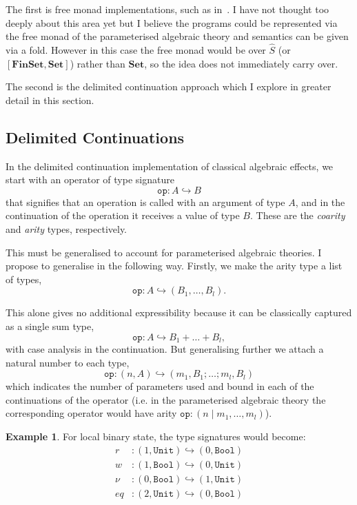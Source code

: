 \documentclass{scrartcl}
\theoremstyle{definition}
\newtheorem{example}[theorem]{Example}
\newcommand{\Set}{\mathbf{Set}}
\newcommand{\Fin}{\mathbf{FinSet}}
\newcommand{\op}{\mathtt{op}}
\newcommand{\Unit}{\mathtt{Unit}}
\newcommand{\Bool}{\mathtt{Bool}}
\begin{document}
The first is free monad implementations, such as in~\cite{wu_effect_2014}. I have not thought too deeply about this area yet but I believe the programs could be represented via the free monad of the parameterised algebraic theory and semantics can be given via a fold. However in this case the free monad would be over $\hat{S}$ (or $[\Fin,\Set]$) rather than $\Set$, so the idea does not immediately carry over.

The second is the delimited continuation approach which I explore in greater detail in this section.

\subsection{Delimited Continuations}

In the delimited continuation implementation of classical algebraic effects, we start with an operator of type signature
\[
    \op: A \hookrightarrow B
\]
that signifies that an operation is called with an argument of type $A$, and in the continuation of the operation it receives a value of type $B$. These are the \emph{coarity} and \emph{arity} types, respectively.

This must be generalised to account for parameterised algebraic theories. I propose to generalise in the following way. Firstly, we make the arity type a list of types,
\[
    \op: A \hookrightarrow (B_1,\dots, B_l).
\]

This alone gives no additional expressibility because it can be classically captured as a single sum type,
\[
    \op : A \hookrightarrow B_1 + \dots + B_l,
\]
with case analysis in the continuation. But generalising further we attach a natural number to each type,
\[
    \op : (n, A) \hookrightarrow (m_1,B_1;\dots ; m_l,B_l)
\]
which indicates the number of parameters used and bound in each of the continuations of the operator (i.e. in the parameterised algebraic theory the corresponding operator would have arity $\op : (n \mid m_1, \dots, m_l)$).


\begin{example}
For local binary state, the type signatures would become:
\begin{align*}
    r &: (1, \Unit) \hookrightarrow (0, \Bool) \\
    w &: (1, \Bool) \hookrightarrow (0, \Unit) \\
    \nu &: (0, \Bool) \hookrightarrow (1, \Unit) \\
    eq&: (2, \Unit) \hookrightarrow (0, \Bool)
\end{align*}
\end{example}
\end{document}
